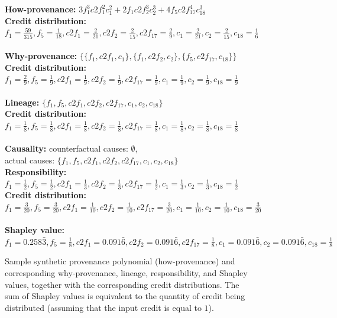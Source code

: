 \documentclass[preprint,12pt,sort&compress]{elsarticle}
\newcommand{\rtwo}[1]{\textcolor{reviewer2}{#1}}
\begin{document}
\begin{figure}
{\footnotesize{\bf How-provenance:}
$
3 f_1^3 c2f_1^2 c_1^2 + 2 f_1 c2f_2^3 c_2^3 + 4 f_5 c2f_{17}^4 c_{18}^3
$ }\\
\hspace{0.5in} 
{\footnotesize{\bf Credit distribution:}\\ $f_1 = \frac{59}{315}, f_5 = \frac{1}{18}, c2f_1 = \frac{2}{21}, c2f_2 = \frac{2}{15}, 
c2f_{17}=\frac{2}{9} , c_1 = \frac{2}{21}, c_2 = \frac{2}{15}, c_{18} = \frac{1}{6} 
$
}
\\
\\
{\footnotesize{\bf Why-provenance:}
$
\{ \{f_1, c2f_1, c_1\}, \{f_1, c2f_2, c_2\}, \{ f_5, c2f_{17}, c_{18}\} \}
$ 
}
\\
{\footnotesize{\bf Credit distribution:}\\
$
f_1 = \frac{2}{9}, f_5 = \frac{1}{9}, c2f_1 = \frac{1}{9}, c2f_2 = \frac{1}{9}, 
c2f_{17}=\frac{1}{9} , c_1 = \frac{1}{9}, c_2 = \frac{1}{9}, c_{18} = \frac{1}{9} 
$
}
\\
\\
{\footnotesize{\bf Lineage: }
$
\{f_1, f_5, c2f_1, c2f_2, c2f_{17}, c_1, c_2, c_{18} \}
$}
\\
{\footnotesize{\bf Credit distribution:}\\
$
f_1 = \frac{1}{8}, f_5 = \frac{1}{8}, c2f_1 = \frac{1}{8}, c2f_2 = \frac{1}{8}, 
c2f_{17}=\frac{1}{8} , c_1 = \frac{1}{8}, c_2 = \frac{1}{8}, c_{18} = \frac{1}{8} 
$}
\\
\\
{\footnotesize{\bf \rtwo{Causality:}}
\rtwo{counterfactual causes: $\emptyset$,\\
actual causes: $\{f_1, f_5, c2f_1, c2f_2, c2f_{17}, c_1, c_2, c_{18} \}$} \\
\rtwo{\textbf{Responsibility:}\\ 
$
f_1 = \frac{1}{2}, f_5 = \frac{1}{2}, c2f_1 = \frac{1}{3}, c2f_2 = \frac{1}{3}, 
c2f_{17}=\frac{1}{2} , c_1 = \frac{1}{3}, c_2 = \frac{1}{3}, c_{18} = \frac{1}{2}  
$
}}
\\
\rtwo{{\footnotesize{\bf Credit distribution:}\\
$
f_1 = \frac{3}{20}, f_5 = \frac{3}{20}, c2f_1 = \frac{1}{10}, c2f_2 = \frac{1}{10}, 
c2f_{17}=\frac{3}{20} , c_1 = \frac{1}{10}, c_2 = \frac{1}{10}, c_{18} = \frac{3}{20}  
$
}}
\\
\\
\rtwo{{\footnotesize{\bf Shapley value:}\\
$
f_1 = 0.258\bar{3}, f_5 = \frac{1}{8}, c2f_1 = 0.091\bar{6}, c2f_2 = 0.091\bar{6}, 
c2f_{17}=\frac{1}{8} , c_1 = 0.091\bar{6}, c_2 = 0.091\bar{6}, c_{18} = \frac{1}{8}  
$
}}

\caption{\rtwo{Sample synthetic provenance polynomial (how-provenance) and corresponding why-provenance, lineage, responsibility, and Shapley values, together with the corresponding credit distributions. The sum of Shapley values  is equivalent to the quantity of credit being distributed (assuming that the input credit is equal to $1$).}}
 \label{fig:syntheticDistributions}
 \end{figure}
\end{document}
